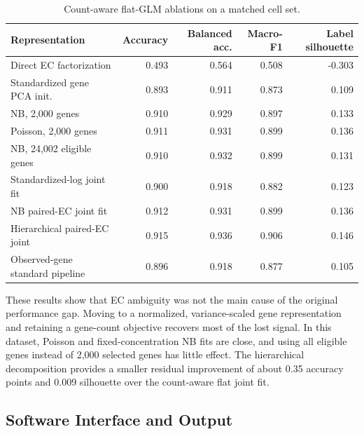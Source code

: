 \documentclass[11pt]{article}
\begin{document}
\begin{table}[h]
  \centering
  \footnotesize
  \begin{tabular}{lrrrr}
    \toprule
    Representation & Accuracy & Balanced acc. & Macro-F1 & Label silhouette \\
    \midrule
    Direct EC factorization        & 0.493 & 0.564 & 0.508 & -0.303 \\
    Standardized gene PCA init.    & 0.893 & 0.911 & 0.873 &  0.109 \\
    NB, 2,000 genes                & 0.910 & 0.929 & 0.897 &  0.133 \\
    Poisson, 2,000 genes           & 0.911 & 0.931 & 0.899 &  0.136 \\
    NB, 24,002 eligible genes      & 0.910 & 0.932 & 0.899 &  0.131 \\
    Standardized-log joint fit     & 0.900 & 0.918 & 0.882 &  0.123 \\
    NB paired-EC joint fit         & 0.912 & 0.931 & 0.899 &  0.136 \\
    Hierarchical paired-EC joint   & 0.915 & 0.936 & 0.906 &  0.146 \\
    Observed-gene standard pipeline& 0.896 & 0.918 & 0.877 &  0.105 \\
    \bottomrule
  \end{tabular}
  \caption{Count-aware flat-GLM ablations on a matched cell set.}
  \label{tab:count-aware-flat}
\end{table}

These results show that EC ambiguity was not the main cause of the original
performance gap. Moving to a normalized, variance-scaled gene representation
and retaining a gene-count objective recovers most of the lost signal. In
this dataset, Poisson and fixed-concentration NB fits are close, and using all
eligible genes instead of 2,000 selected genes has little effect. The
hierarchical decomposition provides a smaller residual improvement of about
0.35 accuracy points and 0.009 silhouette over the count-aware flat joint
fit.

\subsection*{Software Interface and Output}
\end{document}
